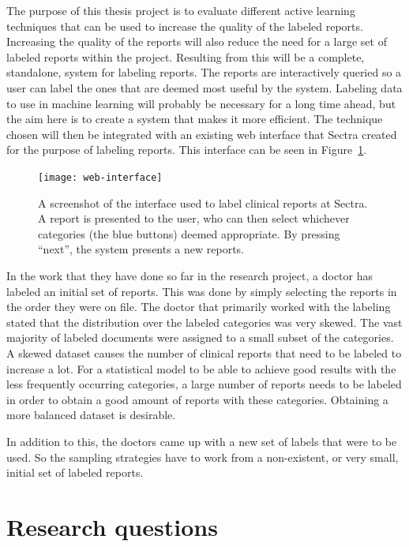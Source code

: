 The purpose of this thesis project is to evaluate different active learning techniques that can be used to increase the quality of the labeled reports.
Increasing the quality of the reports will also reduce the need for a large set of labeled reports within the project.
Resulting from this will be a complete, standalone, system for labeling reports.
The reports are interactively queried so a user can label the ones that are deemed most useful by the system.
Labeling data to use in machine learning will probably be necessary for a long time ahead, but the aim here is to create a system that makes it more efficient.
The technique chosen will then be integrated with an existing web interface that Sectra created for the purpose of labeling reports.
This interface can be seen in Figure~\ref{fig:web-interface}.

\begin{figure}
      \centering
      \texttt{[image: web-interface]}
      \caption{A screenshot of the interface used to label clinical reports at Sectra. 
               A report is presented to the user, who can then select whichever categories (the blue buttons) deemed appropriate.
               By pressing ``next'', the system presents a new reports.}
      \label{fig:web-interface}
\end{figure}

In the work that they have done so far in the research project, a doctor has labeled an initial set of reports.
This was done by simply selecting the reports in the order they were on file.
The doctor that primarily worked with the labeling stated that the distribution over the labeled categories was very skewed.
The vast majority of labeled documents were assigned to a small subset of the categories.
A skewed dataset causes the number of clinical reports that need to be labeled to increase a lot.
For a statistical model to be able to achieve good results with the less frequently occurring categories, a large number of reports needs to be labeled in order to obtain a good amount of reports with these categories.
Obtaining a more balanced dataset is desirable.

In addition to this, the doctors came up with a new set of labels that were to be used.
So the sampling strategies have to work from a non-existent, or very small, initial set of labeled reports.

\section{Research questions}
\label{sec:research-questions}

